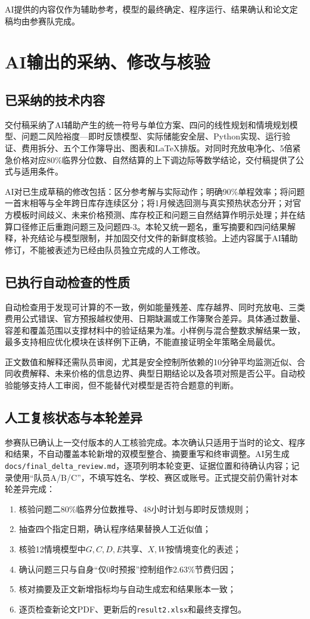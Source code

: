 \documentclass[UTF8,a4paper,zihao=-4,fontset=none]{ctexart}
\begin{document}
AI提供的内容仅作为辅助参考，模型的最终确定、程序运行、结果确认和论文定稿均由参赛队完成。

\section{AI输出的采纳、修改与核验}
\subsection{已采纳的技术内容}
交付稿采纳了AI辅助产生的统一符号与单位方案、四问的线性规划和情境规划模型、问题二风险裕度—即时反馈模型、实际储能安全层、Python实现、运行验证、费用拆分、五个工作簿导出、图表和LaTeX排版。对同时充放电净化、5倍紧急价格对应80\%临界分位数、自然结算的上下调边际等数学结论，交付稿提供了公式与适用条件。

AI对已生成草稿的修改包括：区分参考解与实际动作；明确90\%单程效率；将问题一首末相等与全年跨日库存连续区分；将1月候选回测与真实预热状态分开；对官方模板时间歧义、未来价格预测、库存校正和问题三自然结算作明示处理；并在结算口径修正后重跑问题三及问题四-3。本轮又统一题名，重写摘要和四问结果解释，补充结论与模型限制，并加固交付文件的新鲜度核验。上述内容属于AI辅助修订，不能被表述为已经由队员独立完成的人工修改。

\subsection{已执行自动检查的性质}
自动检查用于发现可计算的不一致，例如能量残差、库存越界、同时充放电、三类费用公式错误、官方预报越权使用、日期缺漏或工作簿聚合差异。具体通过数量、容差和覆盖范围以支撑材料中的验证结果为准。小样例与混合整数求解结果一致，最多支持相应优化模块在该样例下正确，不能直接证明全年策略全局最优。

正文数值和解释还需队员审阅，尤其是安全控制所依赖的10分钟平均监测近似、合同收费解释、未来价格的信息边界、典型日期结论以及各项对照是否公平。自动校验能够支持人工审阅，但不能替代对模型是否符合题意的判断。

\subsection{人工复核状态与本轮差异}
参赛队已确认上一交付版本的人工核验完成。本次确认只适用于当时的论文、程序和结果，不自动覆盖本轮新增的双模型整合、摘要重写和终审调整。AI另生成\texttt{docs/final\_delta\_review.md}，逐项列明本轮变更、证据位置和待确认内容；记录使用“队员A/B/C”，不填写姓名、学校、赛区或账号。正式提交前仍需针对本轮差异完成：
\begin{enumerate}
\item 核验问题二80\%临界分位数推导、48小时计划与即时反馈规则；
\item 抽查四个指定日期，确认程序结果替换人工近似值；
\item 核验12情境模型中$G,C,D,E$共享、$X,W$按情境变化的表述；
\item 确认问题三只与自身“仅0时预报”控制组作2.63\%节费归因；
\item 核对摘要及正文新增指标均与自动生成宏和结果账本一致；
\item 逐页检查新论文PDF、更新后的\texttt{result2.xlsx}和最终支撑包。
\end{enumerate}
\end{document}
